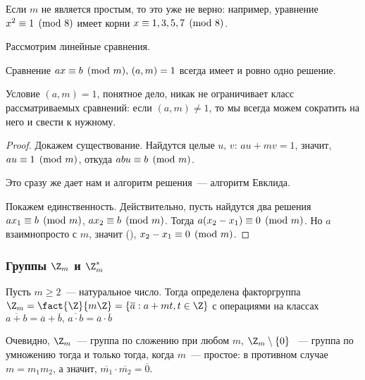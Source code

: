 Если $m$ не является простым, то это уже не верно: например, уравнение
$x^2 \equiv 1 \pmod 8$ имеет корни $x \equiv 1, 3, 5, 7 \pmod 8$.

Рассмотрим линейные сравнения.
\begin{stm}
  Сравнение $ax \equiv b \pmod m,\,(a,m)=1$ всегда имеет и ровно одно решение.
\end{stm}
\begin{note}
Условие $(a,m)=1$, понятное дело, никак не ограничивает класс рассматриваемых 
сравнений: если $(a,m)\neq1$, то мы всегда можем сократить на него и
свести к нужному.
\end{note}
\begin{proof}
	Докажем существование. Найдутся целые $u,\,v$: $au+mv=1$, значит, 
	$au\equiv1\pmod m$, откуда $abu\equiv b\pmod m$.
\begin{note}
Это сразу же дает нам и алгоритм решения~— алгоритм Евклида.
\end{note}
	Покажем единственность. Действительно, пусть найдутся два решения 
	$ax_1\equiv b\pmod m$, $ax_2\equiv b\pmod m$. Тогда $a(x_2-x_1)\equiv0\pmod m$. Но
	$a$ взаимнопросто с $m$, значит (), $x_2-x_1\equiv0\pmod m$.
\end{proof}

\subsubsection{Группы $\Z_m$ и $\Z_m^*$}

Пусть $m \geqslant 2$~— натуральное число. Тогда определена факторгруппа 
$\Z_m = \fact{\Z}{m\Z}=\{\overline{a}: a + mt, t \in \Z \}$ с операциями на
классах $\overline{a+b} = \overline{a} + \overline{b},\,
\overline{a\cdot b} = \overline{a} \cdot \overline{b}$

Очевидно, $\Z_m$~— группа по сложению при любом $m$, $\Z_m\setminus\{0\}$
~— группа по умножению тогда и только тогда, когда $m$~— простое: 
в противном случае $m = m_1m_2$, а значит, $\overline{m_1}\cdot\overline{m_2} = 
\overline{0}$.

